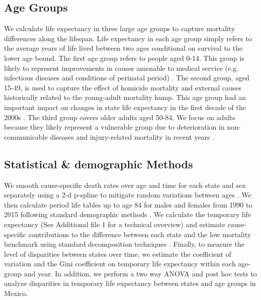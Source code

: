 \documentclass{bmcart}
\begin{document}

\subsection*{Age Groups}

We calculate life expectancy in three large age groups to capture mortality differences along the lifespan. Life expectancy in each age group simply refers to the average years of life lived between two ages conditional on survival to the lower age bound. The first age group refers to people aged 0-14. This group is likely to represent improvements in causes amenable to medical service (e.g. infectious diseases and conditions of perinatal period) \cite{canudas2014}. The second group, aged 15-49, is used to capture the effect of homicide mortality and external causes historically related to the young-adult mortality hump. This age group had an important impact on changes in state life expectancy in the first decade of the 2000s \cite{Aburto2015}. The third group covers older adults aged 50-84. We focus on adults because they likely represent a vulnerable group due to deterioration in non-communicable diseases and injury-related mortality in recent years \cite{gonzalez2011health,gomez2016dissonant}.

\subsection*{Statistical \& demographic Methods}
We smooth cause-specific death rates over age and time for each
state and sex separately using a 2-d p-spline
to mitigate random variations between ages \cite{GC2012}. We then calculate period life tables up to
age 84 for males and females from 1990 to 2015 following standard demographic methods \cite{HMDMP}. We calculate the temporary life expectancy \cite{arriaga1984} (See Additional file 1 for a technical overview) and estimate cause-specific contributions to the difference between
each state and the low mortality benchmark using
 standard decomposition techniques \cite{horiuchi2008}. Finally, to measure the level of disparities between states over time, we estimate the coefficient of variation and the Gini coefficient on temporary life expectancy within each age-group and year. In addition, we perform a two way ANOVA and post hoc tests to analyze disparities in temporary life expectancy between states and age groups in Mexico. 
\end{document}

